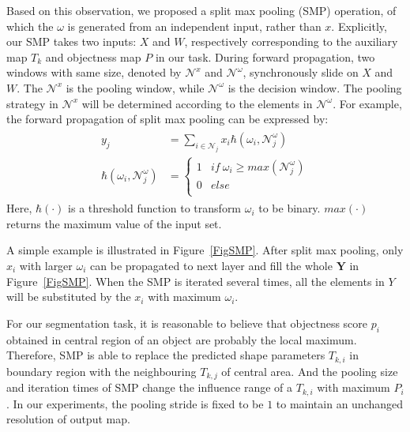 Based on this observation, we proposed a split max pooling (SMP) operation, of which the $\omega$ is generated from an independent input, rather than $x$.
Explicitly, our SMP takes two inputs: $X$ and $W$, respectively corresponding to the auxiliary map $T_k$ and objectness map $P$ in our task.
During forward propagation, two windows with same size, denoted by $\mathcal{N}^{x}$ and $\mathcal{N}^{\omega}$, synchronously slide on $X$ and $W$.
The $\mathcal{N}^{x}$ is the pooling window, while $\mathcal{N}^{\omega}$ is the decision window.
The pooling strategy in $\mathcal{N}^{x}$ will be determined according to the elements in $\mathcal{N}^{\omega}$.
For example, the forward propagation of split max pooling can be expressed by:
\begin{eqnarray}\label{smp}
\begin{aligned}
y_{j} &= \sum_{i\in \mathcal{N}_{j}}x_{i}\hbar(\omega_{i},\mathcal{N}^{\omega}_{j})\\
\hbar(\omega_{i},\mathcal{N}^{\omega}_{j})&=\left\{\begin{array}{cc}
1&if~\omega_{i}\geq max(\mathcal{N}^{\omega}_{j})\\
0&else\\
\end{array}\right.
\end{aligned}
\end{eqnarray}
Here, $\hbar(\cdot)$ is a threshold function to transform $\omega_i$ to be binary.
$max(\cdot)$ returns the maximum value of the input set.

A simple example is illustrated in Figure~\ref{FigSMP}.
After split max pooling, only $x_i$ with larger $\omega_i$ can be propagated to next layer and fill the whole $\mathbf{Y}$ in Figure~\ref{FigSMP}.
When the SMP is iterated several times, all the elements in $Y$ will be substituted by the $x_i$ with maximum $\omega_i$.

For our segmentation task, it is reasonable to believe that objectness score $p_i$ obtained in central region of an object are probably the local maximum.
Therefore, SMP is able to replace the predicted shape parameters $T_{k,i}$ in boundary region with the neighbouring $T_{k,j}$ of central area.
And the pooling size and iteration times of SMP change the influence range of a $T_{k,i}$ with maximum $P_i$.
In our experiments, the pooling stride is fixed to be $1$ to maintain an unchanged resolution of output map.

